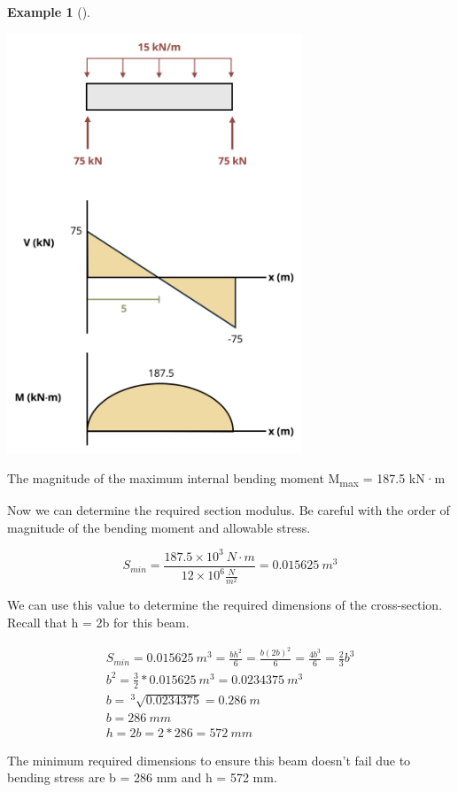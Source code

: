 \documentclass[
  letterpaper,
  DIV=11,
  numbers=noendperiod]{scrreprt}
\theoremstyle{definition}
\newtheorem{example}{Example}[chapter]
\theoremstyle{remark}
\begin{document}
\begin{tcolorbox}
\begin{example}[]
\begin{tcolorbox}
\begin{center}
\includegraphics[width=3.45833in,height=\textheight]{images/CH9 PNGs/Example 9.4 part 2.png}
\end{center}

The magnitude of the maximum internal bending moment
\textbar M\textsubscript{max}\textbar{} = 187.5 kN·m

Now we can determine the required section modulus. Be careful with the
order of magnitude of the bending moment and allowable stress.

\[
S_{min}=\frac{187.5\times10^3{~N}\cdot{m}}{12\times10^6\frac{N}{m^2}}=0.015625{~m}^3
\]

We can use this value to determine the required dimensions of the
cross-section. Recall that h = 2b for this beam.

\[
\begin{gathered}
S_{min}=0.015625{~m^3}=\frac{b h^2}{6}=\frac{b(2 b)^2}{6}=\frac{4 b^3}{6}=\frac{2}{3} b^3 \\
b^2=\frac{3}{2} * 0.015625{~m^3}=0.0234375{~m^3} \\
b=~^3\sqrt{0.0234375}=0.286{~m} \\
b=286{~mm} \\
h=2b=2 * 286=572{~mm}
\end{gathered}
\]

The minimum required dimensions to ensure this beam doesn't fail due to
bending stress are b = 286 mm and h = 572 mm.

\end{tcolorbox}

\end{example}

\end{tcolorbox}
\end{document}
